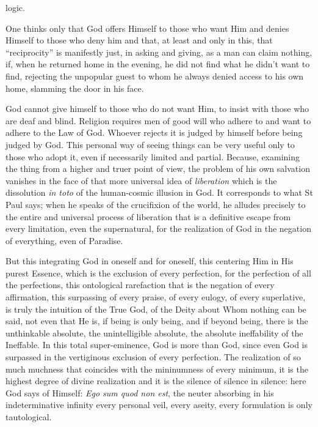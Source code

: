 logic.

One thinks only that God offers Himself to those who want Him and denies Himself to those who deny him and that, at least and only in this, that ``reciprocity'' is manifestly just, in asking and giving, as a man can claim nothing, if, when he returned home in the evening, he did not find what he didn't want to find, rejecting the unpopular guest to whom he always denied access to his own home, slamming the door in his face.

God cannot give himself to those who do not want Him, to insist with those who are deaf and blind. Religion requires men of good will who adhere to and want to adhere to the Law of God. Whoever rejects it is judged by himself before being judged by God. This personal way of seeing things can be very useful only to those who adopt it, even if necessarily limited and partial. Because, examining the thing from a higher and truer point of view, the problem of his own salvation vanishes in the face of that more universal idea of \emph{liberation} which is the dissolution \emph{in toto} of the human-cosmic illusion in God. It corresponds to what St Paul says; when he speaks of the crucifixion of the world, he alludes precisely to the entire and universal process of liberation that is a definitive escape from every limitation, even the supernatural, for the realization of God in the negation of everything, even of Paradise.

But this integrating God in oneself and for oneself, this centering Him in His purest Essence, which is the exclusion of every perfection, for the perfection of all the perfections, this ontological rarefaction that is the negation of every affirmation, this surpassing of every praise, of every eulogy, of every superlative, is truly the intuition of the True God, of the Deity about Whom nothing can be said, not even that He is, if being is only being, and if beyond being, there is the unthinkable absolute, the unintelligible absolute, the absolute ineffability of the Ineffable. In this total super-eminence, God is more than God, since even God is surpassed in the vertiginous exclusion of every perfection. The realization of so much muchness that coincides with the mininumness of every minimum, it is the highest degree of divine realization and it is the silence of silence in silence: here God says of Himself: \emph{Ego sum quod non est}, the neuter absorbing in his indeterminative infinity every personal veil, every aseity, every formulation is only tautological.


